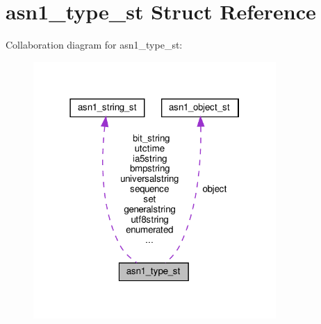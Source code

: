 \hypertarget{structasn1__type__st}{}\section{asn1\+\_\+type\+\_\+st Struct Reference}
\label{structasn1__type__st}


Collaboration diagram for asn1\+\_\+type\+\_\+st\+:
\nopagebreak
\begin{figure}[H]
\begin{center}
\leavevmode
\includegraphics[width=262pt]{structasn1__type__st__coll__graph}
\end{center}
\end{figure}
